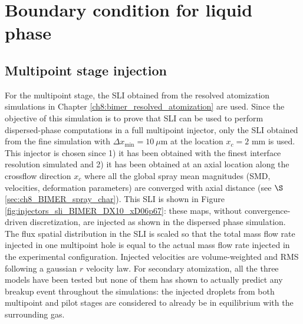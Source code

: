 \section{Boundary condition for liquid phase}
\label{sec:ch9_BIMER_BCs_for_liquid_phase}


\subsection{Multipoint stage injection}

For the multipoint stage, the SLI obtained from the resolved atomization simulations in Chapter \ref{ch8:bimer_resolved_atomization} are used. Since the objective of this simulation is to prove that SLI can be used to perform dispersed-phase computations in a full multipoint injector, only the SLI obtained from the fine simulation with $\Delta x_\mathrm{min} = 10~\mu$m at the location $x_c = 2$ mm is used. This injector is chosen since 1) it has been obtained with the finest interface resolution simulated and 2) it has been obtained at an axial location along the crossflow direction $x_c$ where all the global spray mean magnitudes (SMD, velocities, deformation parameters) are converged with axial distance (see $\S$\ref{sec:ch8_BIMER_spray_char}). This SLI is shown in Figure \ref{fig:injectors_sli_BIMER_DX10_xD06p67}: these maps, without convergence-driven discretization, are injected as shown in the dispersed phase simulation. The flux spatial distribution in the SLI is scaled so that the total mass flow rate injected in one multipoint hole is equal to the actual mass flow rate injected in the experimental configuration. Injected velocities are volume-weighted and RMS following a gaussian $r$ velocity law. For secondary atomization, all the three models have been tested but none of them has shown to actually predict any breakup event throughout the simulations: the injected droplets from both multipoint and pilot stages are considered to already be in equilibrium with the surrounding gas.



